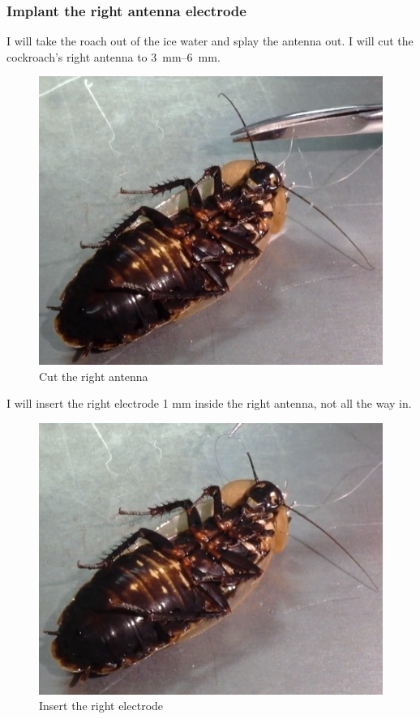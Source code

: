 \subsubsection{Implant the right antenna electrode}
I will take the roach out of the ice water and splay the antenna out. I will cut the cockroach's right antenna to \SIrange{3}{6}{\milli\meter}. 
{\begin{figure}[ht!]
\centering
\includegraphics[scale=0.5]{Surgery Photos/cut.jpg}
\caption{Cut the right antenna}
\label{fig:cut}
\end{figure}}
I will insert the right electrode 1 mm inside the right antenna, not all the way in. 
{\begin{figure}[ht!]
\centering
\includegraphics[scale=0.5]{Surgery Photos/relectrode1.jpg}
\caption{Insert the right electrode}
\label{fig:relectrode1}
\end{figure}}
